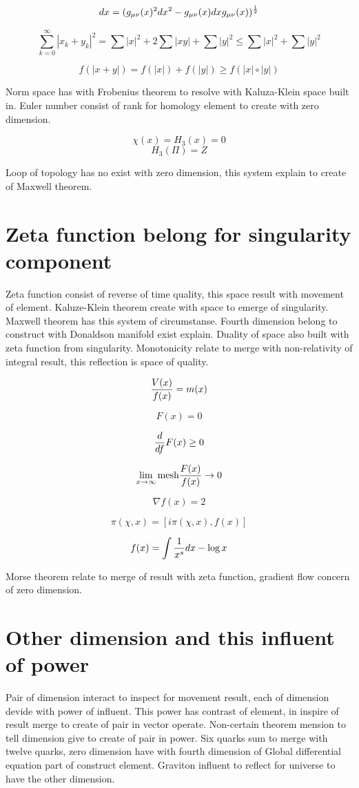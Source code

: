 \documentclass{jsarticle}
\begin{document}
$$ dx = (g_{\mu\nu}(x)^2dx^2 - g_{\mu\nu}(x)dxg_{\mu\nu}(x))^{1 \over 2} $$

$$ \sum^{\infty}_{k=0} |x_{k} + y_{k}|^2 = \sum |x|^2 + 2\sum|xy| + \sum|y|^2 \le \sum|x|^2 + \sum|y|^2 $$

$$ f(|x + y|) = f(|x|) + f(|y|) \ge f(|x| \circ |y|) $$

  Norm space has with Frobenius theorem to resolve with Kaluza-Klein space built in. Euler number consist of rank
for homology element to create with zero dimension.

$$ \chi(x) = H_{3}(x) = 0 $$
$$ H_{3}(\Pi) = Z $$

  Loop of topology has no exist with zero dimension, this system explain to create of Maxwell theorem.

  \section{Zeta function belong for singularity component}

  Zeta function consist of reverse of time quality, this space result with movement of element. Kaluze-Klein theorem
create with space to emerge of singularity. Maxwell theorem has this system of circumstanse. Fourth dimension belong
to construct with Donaldson manifold exist explain. Duality of space also built with zeta function from singularity.
Monotonicity relate to merge with non-relativity of integral result, this reflection is space of quality.

$$ {V(x) \over f(x)} = m(x) $$

$$ F(x) = 0 $$

$$ {d \over df}F(x) \ge 0 $$

$$ \lim_{x \to \infty} \mathrm{mesh} {F(x) \over  f(x)} \to 0 $$

$$ \nabla f(x) = 2 $$

$$ \pi(\chi, x) = [i\pi(\chi,x), f(x)] $$

$$ f(x) = \int {1 \over x^s}dx - \log x $$

  Morse theorem relate to merge of result with zeta function, gradient flow concern of zero dimension.

\section{Other dimension and this influent of power}

  Pair of dimension interact to inspect for movement result, each of dimension devide with power of influent.
This power has contrast of element, in inspire of result merge to create of pair in vector operate.
Non-certain theorem mension to tell dimension give to create of pair in power. Six quarks sum to merge with
twelve quarks, zero dimension have with fourth dimension of Global differential equation part of construct element.
Graviton influent to reflect for universe to have the other dimension.
\end{document}
